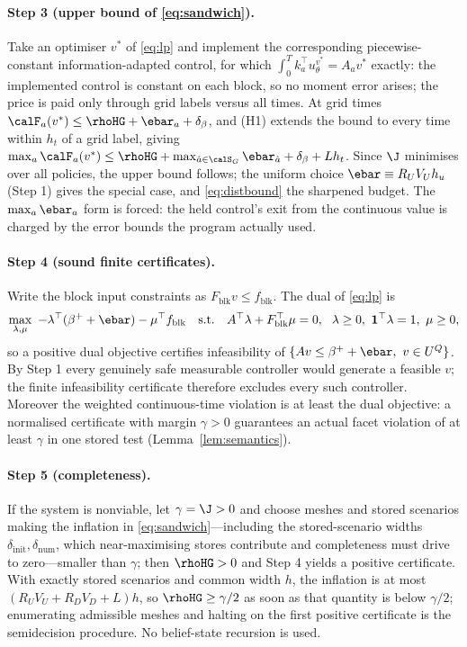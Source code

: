 \paragraph{Step 3 (upper bound of \eqref{eq:sandwich}).}
Take an optimiser $v^\ast$ of \eqref{eq:lp} and implement the corresponding piecewise-constant information-adapted control, for which $\int_0^Tk_a^\top u^{v^\ast}_\theta=A_av^\ast$ exactly: the implemented control is constant on each block, so no moment error arises; the price is paid only through grid labels versus all times. At grid times $\calF_a(v^\ast)\le\rhoHG+\ebar_a+\delta_\beta$, and (H1) extends the bound to every time within $h_t$ of a grid label, giving $\max_a\calF_a(v^\ast)\le\rhoHG+\max_{\hat a\in\calS_G}\ebar_{\hat a}+\delta_\beta+Lh_t$. Since $\J$ minimises over all policies, the upper bound follows; the uniform choice $\ebar\equiv R_UV_Uh_u$ (Step 1) gives the special case, and \eqref{eq:distbound} the sharpened budget. The $\max_a\ebar_a$ form is forced: the held control's exit from the continuous value is charged by the error bounds the program actually used.

\paragraph{Step 4 (sound finite certificates).}
Write the block input constraints as $F_{\mathrm{blk}}v\le f_{\mathrm{blk}}$. The dual of \eqref{eq:lp} is
\begin{equation}\label{eq:dual}
\max_{\lambda,\mu}\ -\lambda^\top(\beta^++\ebar)-\mu^\top f_{\mathrm{blk}}\quad\text{s.t.}\quad A^\top\lambda+F_{\mathrm{blk}}^\top\mu=0,\ \ \lambda\ge0,\ \mathbf 1^\top\lambda=1,\ \mu\ge0 ,
\end{equation}
so a positive dual objective certifies infeasibility of $\{Av\le\beta^++\ebar,\ v\in U^Q\}$. By Step 1 every genuinely safe measurable controller would generate a feasible $v$; the finite infeasibility certificate therefore excludes every such controller. Moreover the weighted continuous-time violation is at least the dual objective: a normalised certificate with margin $\gamma>0$ guarantees an actual facet violation of at least $\gamma$ in one stored test (Lemma~\ref{lem:semantics}).

\paragraph{Step 5 (completeness).}
If the system is nonviable, let $\gamma=\J>0$ and choose meshes and stored scenarios making the inflation in \eqref{eq:sandwich}---including the stored-scenario widths $\delta_{\mathrm{init}},\delta_{\mathrm{num}}$, which near-maximising stores contribute and completeness must drive to zero---smaller than $\gamma$; then $\rhoHG>0$ and Step 4 yields a positive certificate. With exactly stored scenarios and common width $h$, the inflation is at most $(R_UV_U+R_DV_D+L)h$, so $\rhoHG\ge\gamma/2$ as soon as that quantity is below $\gamma/2$; enumerating admissible meshes and halting on the first positive certificate is the semidecision procedure. No belief-state recursion is used.

